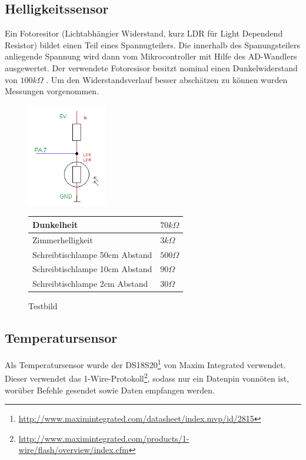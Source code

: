 \subsection{Helligkeitssensor}
Ein Fotoresitor (Lichtabhängier Widerstand, kurz LDR für Light Dependend Resistor) bildet einen Teil eines Spannugteilers. Die innerhalb des Spanungsteilers anliegende Spannung wird dann vom Mikrocontroller mit Hilfe des AD-Wandlers ausgewertet.
Der verwendete Fotoresisor besitzt nominal einen Dunkelwiderstand von $100 k\Omega$ .
Um den Widerstandsverlauf besser abschätzen zu können wurden Messungen vorgenommen.
\begin{figure}[h]
  \begin{center}
  \begin{minipage}[b]{0.3\textwidth}
        \includegraphics[height=4.5cm]{skizzen/helligkeitssensor_schmatic.png}
        \caption{Testbild}
  \end{minipage}
  \hspace{0.07\textwidth}
  \begin{minipage}[b]{0.6\textwidth}
    \begin{tabular}[h]{||l | l||}
	  \hline \hline
	  Dunkelheit& $70 k\Omega$ \\ \hline
	  Zimmerhelligkeit & $3 k\Omega$ \\ \hline
	  Schreibtischlampe 50cm Abstand& $500 \Omega$ \\ \hline
	  Schreibtischlampe 10cm Abstand& $90 \Omega$ \\ \hline
	  Schreibtischlampe 2cm Abstand& $30 \Omega$  \\
	  \hline\hline
    \end{tabular} 
    \label{Modellversuch} 
  \end{minipage}
  \end{center}
\end{figure}
%
\subsection{Temperatursensor}
Als Temperatursensor wurde der DS18S20\footnote{\url{http://www.maximintegrated.com/datasheet/index.mvp/id/2815}} von Maxim Integrated verwendet. Dieser verwendet das 1-Wire\textsuperscript{\textregistered}-Protokoll\footnote{\url{http://www.maximintegrated.com/products/1-wire/flash/overview/index.cfm}}, sodass nur ein Datenpin vonnöten ist, worüber Befehle gesendet sowie Daten empfangen werden.

